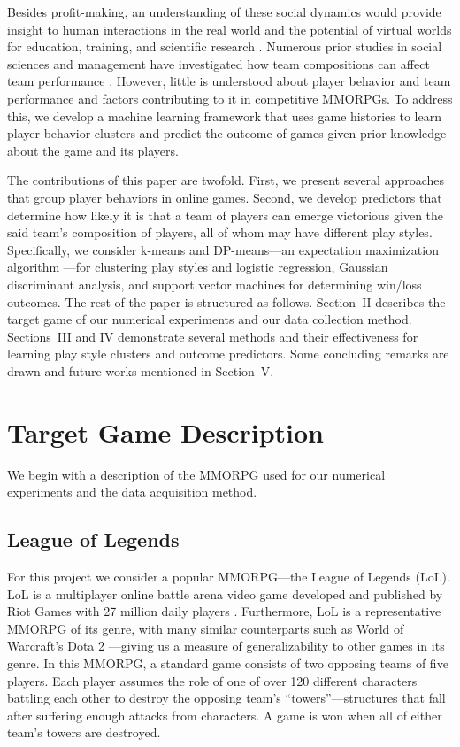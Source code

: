 \documentclass[letterpaper,10 pt,conference]{ieeeconf}
\begin{document}
Besides profit-making, an understanding of these social dynamics would provide insight to human interactions in the real world and the potential of virtual worlds for education, training, and scientific research \cite{Bai:12,Dic:05}. Numerous prior studies in social sciences and management have investigated how team compositions can affect team performance \cite{Spo:11,HA:08}. However, little is understood about player behavior and team performance and factors contributing to it in competitive MMORPGs. To address this, we develop a machine learning framework that uses game histories to learn player behavior clusters and predict the outcome of games given prior knowledge about the game and its players. 

The contributions of this paper are twofold. First, we present several approaches that group player behaviors in online games. Second, we develop predictors that determine how likely it is that a team of players can emerge victorious given the said team's composition of players, all of whom may have different play styles. Specifically, we consider k-means and DP-means---an expectation maximization algorithm \cite{KJ:12}---for clustering play styles and logistic regression, Gaussian discriminant analysis, and support vector machines for determining win/loss outcomes. The rest of the paper is structured as follows. Section~II describes the target game of our numerical experiments and our data collection method. Sections~III and IV demonstrate several methods and their effectiveness for learning play style clusters and outcome predictors. Some concluding remarks are drawn and future works mentioned in Section~V.

\section{Target Game Description}

We begin with a description of the MMORPG used for our numerical experiments and the data acquisition method.

\subsection{League of Legends}

For this project we consider a popular MMORPG---the League of Legends (LoL). LoL is a multiplayer online battle arena video game developed and published by Riot Games with 27 million daily players \cite{Tas:14}. Furthermore, LoL is a representative MMORPG of its genre, with many similar counterparts such as World of Warcraft's Dota 2 \cite{Suz:09}---giving us a measure of generalizability to other games in its genre. In this MMORPG, a standard game consists of two opposing teams of five players. Each player assumes the role of one of over 120 different characters battling each other to destroy the opposing team's ``towers''---structures that fall after suffering enough attacks from characters. A game is won when all of either team's towers are destroyed. 
\end{document}

